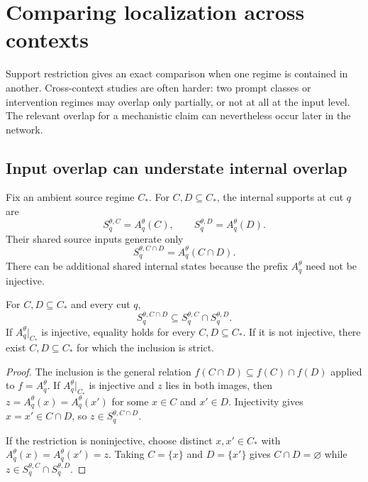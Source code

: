 \section{Comparing localization across contexts}
\label{sec:context-comparison}

Support restriction gives an exact comparison when one regime is contained in another. Cross-context studies are often harder: two prompt classes or intervention regimes may overlap only partially, or not at all at the input level. The relevant overlap for a mechanistic claim can nevertheless occur later in the network.

\subsection{Input overlap can understate internal overlap}

Fix an ambient source regime $C_\ast$. For $C,D\subseteq C_\ast$, the internal supports at cut $q$ are
\[
S_q^{\theta,C}=A_q^\theta(C),
\qquad
S_q^{\theta,D}=A_q^\theta(D).
\]
Their shared source inputs generate only
\[
S_q^{\theta,C\cap D}=A_q^\theta(C\cap D).
\]
There can be additional shared internal states because the prefix $A_q^\theta$ need not be injective.

\begin{proposition}
\label{prop:source-overlap}
For $C,D\subseteq C_\ast$ and every cut $q$,
\begin{equation}
S_q^{\theta,C\cap D}
\subseteq
S_q^{\theta,C}\cap S_q^{\theta,D}.
\label{eq:source-overlap-inclusion}
\end{equation}
If $A_q^\theta|_{C_\ast}$ is injective, equality holds for every $C,D\subseteq C_\ast$. If it is not injective, there exist $C,D\subseteq C_\ast$ for which the inclusion is strict.
\end{proposition}

\begin{proof}
The inclusion is the general relation $f(C\cap D)\subseteq f(C)\cap f(D)$ applied to $f=A_q^\theta$. If $A_q^\theta|_{C_\ast}$ is injective and $z$ lies in both images, then $z=A_q^\theta(x)=A_q^\theta(x')$ for some $x\in C$ and $x'\in D$. Injectivity gives $x=x'\in C\cap D$, so $z\in S_q^{\theta,C\cap D}$.

If the restriction is noninjective, choose distinct $x,x'\in C_\ast$ with $A_q^\theta(x)=A_q^\theta(x')=z$. Taking $C=\{x\}$ and $D=\{x'\}$ gives $C\cap D=\varnothing$ while $z\in S_q^{\theta,C}\cap S_q^{\theta,D}$.
\end{proof}

